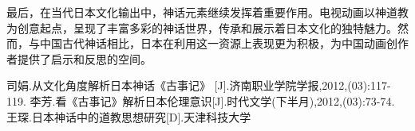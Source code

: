 \documentclass{ctexart}
\begin{document}
最后，在当代日本文化输出中，神话元素继续发挥着重要作用。电视动画以神道教为创意起点，呈现了丰富多彩的神话世界，传承和展示着日本文化的独特魅力。然而，与中国古代神话相比，日本在利用这一资源上表现更为积极，为中国动画创作者提供了启示和反思的空间。



\newpage

\begin{thebibliography}{99}
    司娟.从文化角度解析日本神话《古事记》 [J].济南职业学院学报,2012,(03):117-119.
    李芳.看《古事记》解析日本伦理意识[J].时代文学(下半月),2012,(03):73-74.
    王琛.日本神话中的道教思想研究[D].天津科技大学
\end{thebibliography}
\end{document}
